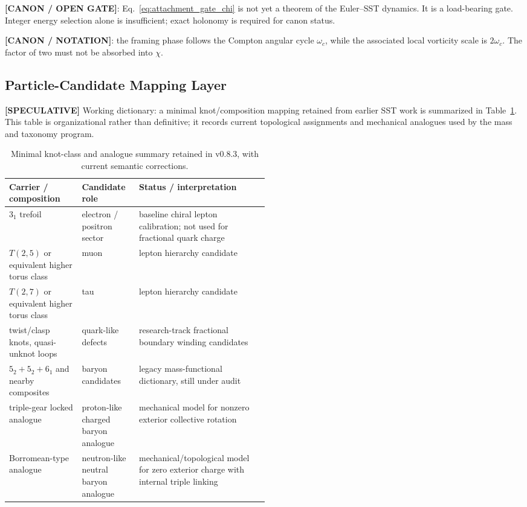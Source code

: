 \documentclass[11pt]{article}
\theoremstyle{definition}
\theoremstyle{plain}
\theoremstyle{remark}
\begin{document}
        \textbf{[CANON / OPEN GATE]}: Eq.~\eqref{eq:attachment_gate_chi} is not yet a theorem of the Euler--SST dynamics. It is a load-bearing gate. Integer energy selection alone is insufficient; exact holonomy is required for canon status.

        \textbf{[CANON / NOTATION]}: the framing phase follows the Compton angular cycle $\omega_c$, while the associated local vorticity scale is $2\omega_c$. The factor of two must not be absorbed into $\chi$.


    \subsection{Particle-Candidate Mapping Layer}
        \label{subsec:integration_knotmap}

        \textbf{[SPECULATIVE]} Working dictionary: a minimal knot/composition mapping retained from earlier SST work is summarized in Table~\ref{tab:particle_candidate_mapping}. This table is organizational rather than definitive; it records current topological assignments and mechanical analogues used by the mass and taxonomy program.

        \begin{table}[h]
        \centering
        \caption{Minimal knot-class and analogue summary retained in v0.8.3, with current semantic corrections.}
        \label{tab:particle_candidate_mapping}
        \begin{tabularx}{\linewidth}{p{0.28\linewidth}p{0.22\linewidth}X}
        \hline
        Carrier / composition & Candidate role & Status / interpretation \\
        \hline
        $3_1$ trefoil & electron / positron sector & baseline chiral lepton calibration; not used for fractional quark charge \\
        $T(2,5)$ or equivalent higher torus class & muon & lepton hierarchy candidate \\
        $T(2,7)$ or equivalent higher torus class & tau & lepton hierarchy candidate \\
        twist/clasp knots, quasi-unknot loops & quark-like defects & research-track fractional boundary winding candidates \\
        $5_2+5_2+6_1$ and nearby composites & baryon candidates & legacy mass-functional dictionary, still under audit \\
        triple-gear locked analogue & proton-like charged baryon analogue & mechanical model for nonzero exterior collective rotation \\
        Borromean-type analogue & neutron-like neutral baryon analogue & mechanical/topological model for zero exterior charge with internal triple linking \\
        \hline
        \end{tabularx}
        \end{table}
\end{document}
